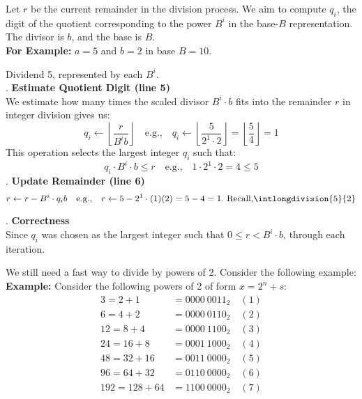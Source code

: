 \newpage

\begin{Proof}
    
    Let $r$ be the current remainder in the division process. We aim to compute $q_i$, the digit of the quotient corresponding to the power $B^i$ in the base-$B$ representation. The divisor is $b$, and the base is $B$.\\

    \noindent
    \textbf{For Example:} $a = 5$ and $b = 2$ in base $B = 10$.

    \noindent
    Dividend 5, represented by each $B^i$.\\

    . \textbf{Estimate Quotient Digit (line 5)}\\
    We estimate how many times the scaled divisor $B^i \cdot b$ fits into the remainder $r$ in integer division gives us:
    \[
    q_i \gets \left\lfloor \frac{r}{B^i b} \right\rfloor \quad \text{e.g.,} \quad q_i \gets \left\lfloor \frac{5}{2^1 \cdot 2} \right\rfloor = \left\lfloor \frac{5}{4} \right\rfloor = 1
    \]
    This operation selects the largest integer $q_i$ such that:
    \[
    q_i \cdot B^i \cdot b \leq r \quad \text{e.g.,} \quad 1 \cdot 2^1 \cdot 2 = 4 \leq 5
    \]
    . \textbf{Update Remainder (line 6)}\\
    \[
    r \gets r - B^i \cdot q_ib \quad \text{e.g.,} \quad r \gets 5 - 2^1 \cdot (1)(2) = 5 - 4 = 1.\text{ Recall,} \intlongdivision{5}{2}
    \]

    . \textbf{Correctness}\\
    Since $q_i$ was chosen as the largest integer such that $0 \leq r < B^i \cdot b$, through each iteration.

\end{Proof}
\noindent
We still need a fast way to divide by powers of 2. Consider the following example:
\textbf{Example:} Consider the following powers of 2 of form $x=2^n+s$:
\begin{align*}
    3 = 2 + 1 &= 0000 \ 0011_2 \quad (1) \\
    6 = 4 + 2 &= 0000 \ 0110_2 \quad (2) \\
    12 = 8 + 4 &= 0000 \ 1100_2 \quad (3) \\
    24 = 16 + 8 &= 0001 \ 1000_2 \quad (4) \\
    48 = 32 + 16 &= 0011 \ 0000_2 \quad (5) \\
    96 = 64 + 32 &= 0110 \ 0000_2 \quad (6) \\
    192 = 128 + 64 &= 1100 \ 0000_2 \quad (7)
\end{align*}


